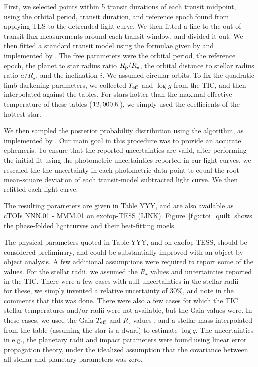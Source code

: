 \documentclass[12pt,twocolumn,tighten]{aastex62}
\begin{document}
First, we selected points within 5 transit durations of each transit
midpoint, using the orbital period, transit duration, and reference
epoch found from applying TLS to the detrended light curve.  We then
fitted a line to the out-of-transit flux measurements around each
transit window, and divided it out.  We then fitted a standard transit
model using the formulae given by \citet{mandel_analytic_2002} and
implemented by \citet[][\texttt{BATMAN}]{kreidberg_batman_2015}.  The
free parameters were the orbital period, the reference epoch, the
planet to star radius ratio $R_{\rm p}/R_\star$, the orbital distance
to stellar radius ratio $a/R_\star$, and the inclination $i$.  We
assumed circular orbits.  To fix the quadratic limb-darkening
parameters, we collected $T_{\rm eff}$ and $\log g$ from the TIC, and
then interpolated against the \citet{claret_limb_2017} tables.  For
stars hotter than the maximal effective temperature of these tables
($12,000\,{\rm K}$), we simply used the coefficients of the hottest
star.

We then sampled the posterior probability distribution using the
\citet{goodman_ensemble_2010} algorithm, as implemented by
\citet[][\texttt{emcee}]{foreman-mackey_emcee_2013}.  Our main goal in
this procedure was to provide an accurate ephemeris.  To ensure that
the reported uncertainties are valid, after performing the initial fit
using the photometric uncertainties reported in our light curves, we
rescaled the the uncertainty in each photometric data point to equal
the root-mean-square deviation of each transit-model subtracted light
curve. We then refitted each light curve.

The resulting parameters are given in Table YYY, and are also
available as cTOIs NNN.01 - MMM.01 on exofop-TESS (LINK).
Figure~\ref{fig:ctoi_quilt} shows the phase-folded lightcurves and
their best-fitting moels.

The physical parameters quoted in Table YYY, and on exofop-TESS,
should be considered preliminary, and could be substantially improved
with an object-by-object analysis.  A few additional assumptions were
required to report some of the values.  For the stellar radii, we
assumed the $R_\star$ values and uncertainties reported in the TIC.
There were a few cases with null uncertainties in the stellar radii --
for these, we simply invented a relative uncertainty of 30\%, and note
in the comments that this was done.  There were also a few cases for
which the TIC stellar temperatures and/or radii were not available,
but the Gaia values were.  In these cases, we used the Gaia $T_{\rm
eff}$ and $R_\star$ values \citep{andrae_apsis_2018}, and a stellar
mass interpolated from the \citet{pecaut_intrinsic_2013} table
(assuming the star is a dwarf) to estimate $\log g$.  The
uncertainties in e.g., the planetary radii and impact parameters were
found using linear error propagation theory, under the idealized
assumption that the covariance between all stellar and planetary
parameters was zero.
\end{document}
